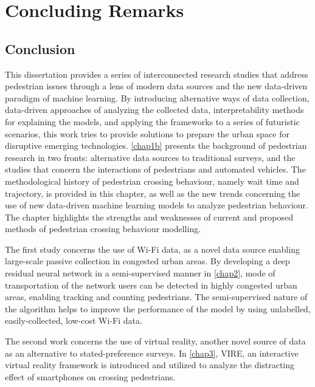 \part{ Concluding Remarks}

\chapter{Conclusion}
\label{chap7}
This dissertation provides a series of interconnected research studies that address pedestrian issues through a lens of modern data sources and the new data-driven paradigm of machine learning. By introducing alternative ways of data collection, data-driven approaches of analyzing the collected data, interpretability methods for explaining the models, and applying the frameworks to a series of futuristic scenarios, this work tries to provide solutions to prepare the urban space for disruptive emerging technologies. \cref{chap1b} presents the background of pedestrian research in two fronts: alternative data sources to traditional surveys, and the studies that concern the interactions of pedestrians and automated vehicles. The methodological history of pedestrian crossing behaviour, namely wait time and trajectory, is provided in this chapter, as well as the new trends concerning the use of new data-driven machine learning models to analyze pedestrian behaviour. The chapter highlights the strengths and weaknesses of current and proposed methods of pedestrian crossing behaviour modelling.

The first study concerns the use of Wi-Fi data, as a novel data source enabling large-scale passive collection in congested urban areas. By developing a deep residual neural network in a semi-supervised manner in \cref{chap2}, mode of transportation of the network users can be detected in highly congested urban areas, enabling tracking and counting pedestrians. The semi-supervised nature of the algorithm helps to improve the performance of the model by using unlabelled, easily-collected, low-cost Wi-Fi data.

The second work concerns the use of virtual reality, another novel source of data as an alternative to stated-preference surveys. In \cref{chap3}, VIRE, an interactive virtual reality framework is introduced and utilized to analyze the distracting effect of smartphones on crossing pedestrians.

